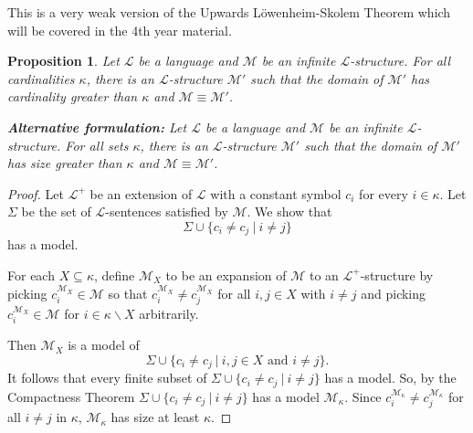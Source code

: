 \documentclass[11pt]{article}
\newtheorem{proposition}[theorem]{Proposition}
\newcommand{\mcal}[1]{\mathcal{#1}}
\newcommand{\st}{\ \vert \ }
\begin{document}
This is a very weak version of the Upwards L\"owenheim-Skolem Theorem which will be covered in the 4th year material.
\begin{proposition}
Let $\mcal{L}$ be a language and $\mcal{M}$ be an infinite $\mcal{L}$-structure. For all cardinalities $\kappa$, there is an $\mcal{L}$-structure $\mcal{M}'$ such that the domain of $\mcal{M}'$ has cardinality greater than $\kappa$ and $\mcal{M}\equiv \mcal{M}'$.

\medskip

\noindent
\textbf{Alternative formulation:} Let $\mcal{L}$ be a language and $\mcal{M}$ be an infinite $\mcal{L}$-structure. For all sets $\kappa$, there is an $\mcal{L}$-structure $\mcal{M}'$ such that the domain of $\mcal{M}'$ has size greater than $\kappa$ and $\mcal{M}\equiv \mcal{M}'$.
\end{proposition}
\begin{proof}
Let $\mcal{L}^+$ be an extension of $\mcal{L}$ with a constant symbol $c_i$ for every $i\in\kappa$. Let $\Sigma$ be the set of $\mcal{L}$-sentences satisfied by $\mcal{M}$.  We show that
\[\Sigma\cup\{c_i\neq c_j \st i\neq j\}\] has a model.

For each $X\subseteq \kappa$, define $\mcal{M}_X$ to be an expansion of $\mcal{M}$ to an $\mcal{L}^+$-structure by picking $c_i^{\mcal{M}_X}\in\mcal{M}$ so that $c_i^{\mcal{M}_X}\neq c_j^{\mcal{M}_X}$ for all $i,j\in X$ with $i\neq j$ and picking $c_i^{\mcal{M}_X}\in\mcal{M}$ for $i\in \kappa\backslash X$ arbitrarily.

Then $\mcal{M}_X$ is a model of
\[\Sigma\cup\{c_i\neq c_j \st i,j\in X \text{ and } i\neq j\}.\] It follows that every finite subset of $\Sigma\cup\{c_i\neq c_j \st i\neq j\}$ has a model. So, by the Compactness Theorem $\Sigma\cup\{c_i\neq c_j \st i\neq j\}$ has a model $\mcal{M}_\kappa$. Since $c_i^{\mcal{M}_\kappa}\neq c_j^{\mcal{M}_\kappa}$ for all $i\neq j$ in $\kappa$, $\mcal{M}_\kappa$ has size at least $\kappa$.
\end{proof}
\end{document}
